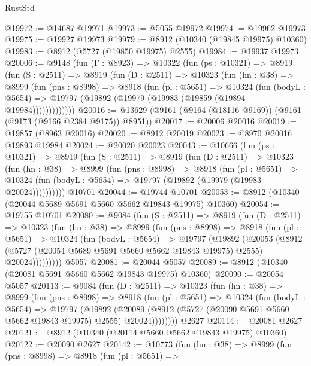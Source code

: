 \begin{lexlean}{RustStd}
\begin{coremodule}
@19972 := @14687 @19971
@19973 := @5055 @19972
@19974 := @19962 @19973
@19975 := @19927 @19973
@19979 := @8912 (@10340 (@19845 @19975) @10360)
@19983 := @8912 (@5727 (@19850 @19975) @2555)
@19984 := @19937 @19973
@20006 := @9148
    (fun (Γ : @8923) =>
    @10322
      (fun (ps : @10321) =>
      @8919
        (fun (S : @2511) =>
        @8919
          (fun (D : @2511) =>
          @10323
            (fun (hn : @38) =>
            @8999
              (fun (pns : @8998) =>
              @8918
                (fun (pl : @5651) =>
                @10324
                  (fun (bodyL : @5654) =>
                  @19797 (@19892 (@19979 (@19983 (@19859 (@19894 @19984)))))))))))))
@20016 := @13629 (@9161 (@9164 (@18116 @9169)) (@9161 (@9173 (@9166 @2384 @9175)) @8951))
@20017 := @20006 @20016
@20019 := @19857 (@8963 @20016)
@20020 := @8912 @20019
@20023 := @8970 @20016 @19893 @19984
@20024 := @20020 @20023
@20043 := @10666
    (fun (ps : @10321) =>
    @8919
      (fun (S : @2511) =>
      @8919
        (fun (D : @2511) =>
        @10323
          (fun (hn : @38) =>
          @8999
            (fun (pns : @8998) =>
            @8918
              (fun (pl : @5651) =>
              @10324 (fun (bodyL : @5654) => @19797 (@19892 (@19979 (@19983 @20024))))))))))
    @10701
@20044 := @19744 @10701
@20053 := @8912 (@10340 (@20044 @5689 @5691 @5660 @5662 @19843 @19975) @10360)
@20054 := @19755 @10701
@20080 := @9084
    (fun (S : @2511) =>
    @8919
      (fun (D : @2511) =>
      @10323
        (fun (hn : @38) =>
        @8999
          (fun (pns : @8998) =>
          @8918
            (fun (pl : @5651) =>
            @10324
              (fun (bodyL : @5654) =>
              @19797
                (@19892
                  (@20053
                    (@8912
                      (@5727 (@20054 @5689 @5691 @5660 @5662 @19843 @19975) @2555)
                      @20024)))))))))
    @5057
@20081 := @20044 @5057
@20089 := @8912 (@10340 (@20081 @5691 @5660 @5662 @19843 @19975) @10360)
@20090 := @20054 @5057
@20113 := @9084
    (fun (D : @2511) =>
    @10323
      (fun (hn : @38) =>
      @8999
        (fun (pns : @8998) =>
        @8918
          (fun (pl : @5651) =>
          @10324
            (fun (bodyL : @5654) =>
            @19797
              (@19892
                (@20089 (@8912 (@5727 (@20090 @5691 @5660 @5662 @19843 @19975) @2555) @20024))))))))
    @2627
@20114 := @20081 @2627
@20121 := @8912 (@10340 (@20114 @5660 @5662 @19843 @19975) @10360)
@20122 := @20090 @2627
@20142 := @10773
    (fun (hn : @38) =>
    @8999
      (fun (pns : @8998) =>
      @8918
        (fun (pl : @5651) =>

\end{coremodule}
\end{lexlean}
